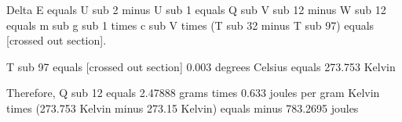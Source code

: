 Delta E equals U sub 2 minus U sub 1 equals Q sub V sub 12 minus W sub 12 equals m sub g sub 1 times c sub V times (T sub 32 minus T sub 97) equals [crossed out section].  

T sub 97 equals [crossed out section]  
0.003 degrees Celsius equals 273.753 Kelvin  

Therefore, Q sub 12 equals 2.47888 grams times 0.633 joules per gram Kelvin times (273.753 Kelvin minus 273.15 Kelvin) equals minus 783.2695 joules